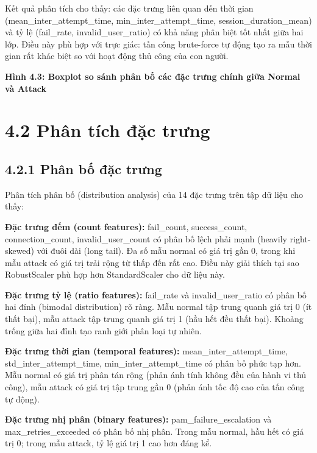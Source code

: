 \documentclass[
  a4paper]{report}
\begin{document}
Kết quả phân tích cho thấy: các đặc trưng liên quan đến thời gian
(mean\_inter\_attempt\_time, min\_inter\_attempt\_time,
session\_duration\_mean) và tỷ lệ (fail\_rate, invalid\_user\_ratio) có
khả năng phân biệt tốt nhất giữa hai lớp. Điều này phù hợp với trực
giác: tấn công brute-force tự động tạo ra mẫu thời gian rất khác biệt so
với hoạt động thủ công của con người.

\textbf{Hình 4.3: Boxplot so sánh phân bố các đặc trưng chính giữa
Normal và Attack}

\section{4.2 Phân tích đặc
trưng}\label{phuxe2n-tuxedch-ux111ux1eb7c-trux1b0ng}

\subsection{4.2.1 Phân bố đặc
trưng}\label{phuxe2n-bux1ed1-ux111ux1eb7c-trux1b0ng}

Phân tích phân bố (distribution analysis) của 14 đặc trưng trên tập dữ
liệu cho thấy:

\textbf{Đặc trưng đếm (count features):} fail\_count, success\_count,
connection\_count, invalid\_user\_count có phân bố lệch phải mạnh
(heavily right-skewed) với đuôi dài (long tail). Đa số mẫu normal có giá
trị gần 0, trong khi mẫu attack có giá trị trải rộng từ thấp đến rất
cao. Điều này giải thích tại sao RobustScaler phù hợp hơn StandardScaler
cho dữ liệu này.

\textbf{Đặc trưng tỷ lệ (ratio features):} fail\_rate và
invalid\_user\_ratio có phân bố hai đỉnh (bimodal distribution) rõ ràng.
Mẫu normal tập trung quanh giá trị 0 (ít thất bại), mẫu attack tập trung
quanh giá trị 1 (hầu hết đều thất bại). Khoảng trống giữa hai đỉnh tạo
ranh giới phân loại tự nhiên.

\textbf{Đặc trưng thời gian (temporal features):}
mean\_inter\_attempt\_time, std\_inter\_attempt\_time,
min\_inter\_attempt\_time có phân bố phức tạp hơn. Mẫu normal có giá trị
phân tán rộng (phản ánh tính không đều của hành vi thủ công), mẫu attack
có giá trị tập trung gần 0 (phản ánh tốc độ cao của tấn công tự động).

\textbf{Đặc trưng nhị phân (binary features):} pam\_failure\_escalation
và max\_retries\_exceeded có phân bố nhị phân. Trong mẫu normal, hầu hết
có giá trị 0; trong mẫu attack, tỷ lệ giá trị 1 cao hơn đáng kể.
\end{document}
